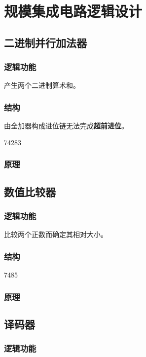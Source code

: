 \chapter{规模集成电路逻辑设计}
\newpage

\section{二进制并行加法器}

\subsection{逻辑功能}

产生两个二进制算术和。

\subsection{结构}

由全加器构成进位链无法完成\textbf{超前进位}。

74283

\subsection{原理}


\newpage
\section{数值比较器}

\subsection{逻辑功能}

比较两个正数而确定其相对大小。

\subsection{结构}

7485

\subsection{原理}


\newpage
\section{译码器}

\subsection{逻辑功能}

